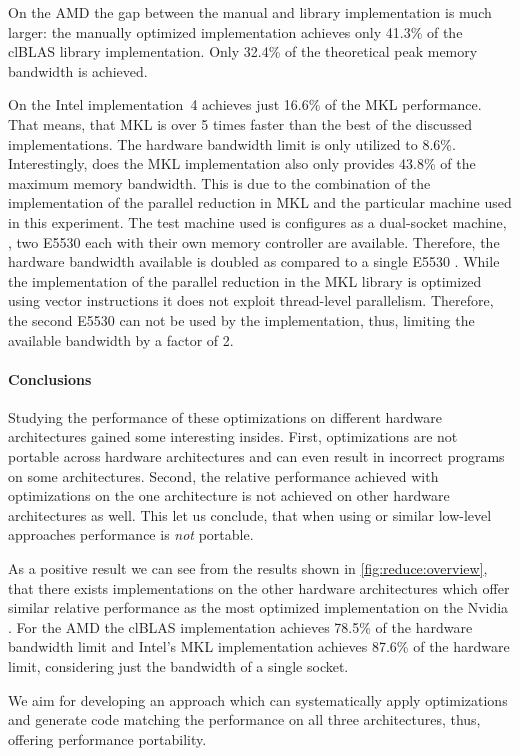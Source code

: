 On the AMD \GPU the gap between the manual and library implementation is much larger:
the manually optimized implementation achieves only 41.3\% of the clBLAS library implementation.
Only 32.4\% of the theoretical peak memory bandwidth is achieved.

On the Intel \CPU implementation~4 achieves just 16.6\% of the MKL performance.
That means, that MKL is over 5 times faster than the best of the discussed implementations.
The hardware bandwidth limit is only utilized to 8.6\%.
Interestingly, does the MKL implementation also only provides 43.8\% of the maximum memory bandwidth.
This is due to the combination of the implementation of the parallel reduction in MKL and the particular machine used in this experiment.
The test machine used is configures as a dual-socket machine, \ie, two E5530 \CPUs each with their own memory controller are available.
Therefore, the hardware bandwidth available is doubled as compared to a single E5530 \CPU.
While the implementation of the parallel reduction in the MKL library is optimized using vector instructions it does not exploit thread-level parallelism.
Therefore, the second E5530 \CPU can not be used by the implementation, thus, limiting the available bandwidth by a factor of 2.

\paragraph{Conclusions}
Studying the performance of these optimizations on different hardware architectures gained some interesting insides.
First, optimizations are not portable across hardware architectures and can even result in incorrect programs on some architectures.
Second, the relative performance achieved with optimizations on the one architecture is not achieved on other hardware architectures as well.
This let us conclude, that when using \OpenCL or similar low-level approaches performance is \emph{not} portable.

As a positive result we can see from the results shown in \autoref{fig:reduce:overview}, that there exists implementations on the other hardware architectures which offer similar relative performance as the most optimized implementation on the Nvidia \GPU.
For the AMD \GPU the clBLAS implementation achieves 78.5\% of the hardware bandwidth limit and Intel's MKL implementation achieves 87.6\% of the hardware limit, considering just the bandwidth of a single \CPU socket.

We aim for developing an approach which can systematically apply optimizations and generate code matching the performance on all three architectures, thus, offering performance portability.

